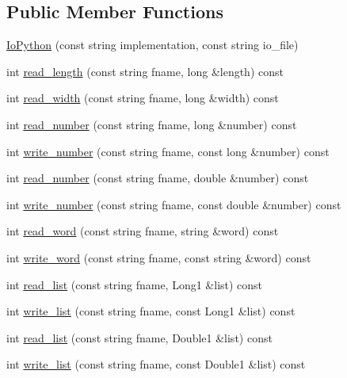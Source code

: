 \subsection*{Public Member Functions}
\begin{DoxyCompactItemize}
\item 
\mbox{\hyperlink{structIoPython_aecfbf8a5a148d102ab584493c7b32477}{Io\+Python}} (const string implementation, const string io\+\_\+file)
\item 
int \mbox{\hyperlink{structIoPython_a0317edc1965de95540713f96300b5fa3}{read\+\_\+length}} (const string fname, long \&length) const
\item 
int \mbox{\hyperlink{structIoPython_a8d0cf7e49496f8393a6c975d8091ee32}{read\+\_\+width}} (const string fname, long \&width) const
\item 
int \mbox{\hyperlink{structIoPython_a181ebe01e99ff21c617dadd43df1c79a}{read\+\_\+number}} (const string fname, long \&number) const
\item 
int \mbox{\hyperlink{structIoPython_acbdb2e4c9bfaeae992572462a6f27538}{write\+\_\+number}} (const string fname, const long \&number) const
\item 
int \mbox{\hyperlink{structIoPython_a601a92b585dda826191bfaabdb11dc81}{read\+\_\+number}} (const string fname, double \&number) const
\item 
int \mbox{\hyperlink{structIoPython_aa1088aef56bd86c4a986460a39e4c3dd}{write\+\_\+number}} (const string fname, const double \&number) const
\item 
int \mbox{\hyperlink{structIoPython_a3de76956d06bbdc6daf93dfb2422ac8a}{read\+\_\+word}} (const string fname, string \&word) const
\item 
int \mbox{\hyperlink{structIoPython_ae9f8fda0e13b5a23923451f83328e00b}{write\+\_\+word}} (const string fname, const string \&word) const
\item 
int \mbox{\hyperlink{structIoPython_a2ebe407ec2594d63cb496a296dab422d}{read\+\_\+list}} (const string fname, Long1 \&list) const
\item 
int \mbox{\hyperlink{structIoPython_a362806b2c79cfd2710bb6aa5abdad81c}{write\+\_\+list}} (const string fname, const Long1 \&list) const
\item 
int \mbox{\hyperlink{structIoPython_ac4e86a5720764c24176c8dce65ff86f3}{read\+\_\+list}} (const string fname, Double1 \&list) const
\item 
int \mbox{\hyperlink{structIoPython_aef1a23954e7bfb682237f2c9c4278b59}{write\+\_\+list}} (const string fname, const Double1 \&list) const

\end{DoxyCompactItemize}
